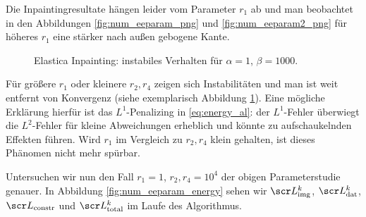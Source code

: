 \documentclass{mythesis}
\begin{document}
Die Inpaintingresultate hängen leider vom Parameter $r_1$ ab und man beobachtet in den Abbildungen \ref{fig:num_eeparam_png} und \ref{fig:num_eeparam2_png} für höheres $r_1$ eine stärker nach außen gebogene Kante.

\begin{figure}[ht]
    \centering
    \caption{Elastica Inpainting: instabiles Verhalten für $\alpha = 1$, $\beta = 1000$.}
    \label{fig:num_eeparam_instab}
\end{figure}

Für größere $r_1$ oder kleinere $r_2, r_4$ zeigen sich Instabilitäten und man ist weit entfernt von Konvergenz (siehe exemplarisch Abbildung \ref{fig:num_eeparam_instab}).
Eine mögliche Erklärung hierfür ist das $L^1$-Penalizing in \eqref{eq:energy_al}: der $L^1$-Fehler überwiegt die $L^2$-Fehler für kleine Abweichungen erheblich und könnte zu aufschaukelnden Effekten führen.
Wird $r_1$ im Vergleich zu $r_2, r_4$ klein gehalten, ist dieses Phänomen nicht mehr spürbar.

Untersuchen wir nun den Fall $r_1 = 1$, $r_2, r_4 = 10^4$ der obigen Parameterstudie genauer.
In Abbildung \ref{fig:num_eeparam_energy} sehen wir $\scr L_{\mathrm{img}}^k$, $\scr L_{\mathrm{dat}}^k$, $\scr L_{\mathrm{constr}}$ und $\scr L_{\mathrm{total}}^k$ im Laufe des Algorithmus.
\end{document}
